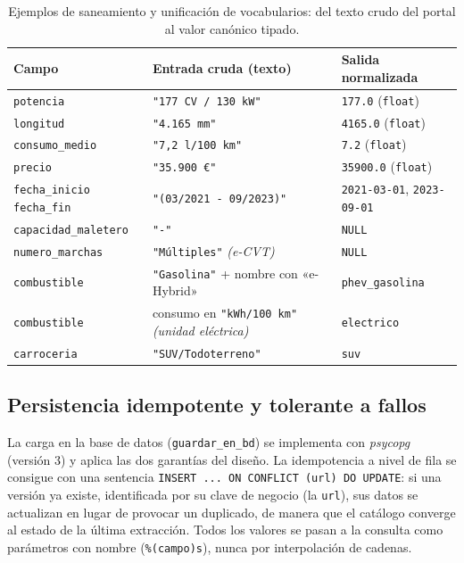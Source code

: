 \begin{table}[H]
\centering
\begin{tabular}{p{3.1cm}p{5.0cm}p{3.8cm}}
\hline
\textbf{Campo} & \textbf{Entrada cruda (texto)} & \textbf{Salida normalizada} \\
\hline
\texttt{potencia} & \texttt{"177 CV / 130 kW"} & \texttt{177.0} (\texttt{float}) \\
\hline
\texttt{longitud} & \texttt{"4.165 mm"} & \texttt{4165.0} (\texttt{float}) \\
\hline
\texttt{consumo\_medio} & \texttt{"7,2 l/100 km"} & \texttt{7.2} (\texttt{float}) \\
\hline
\texttt{precio} & \texttt{"35.900 \euro{}"} & \texttt{35900.0} (\texttt{float}) \\
\hline
\texttt{fecha\_inicio} \texttt{fecha\_fin} & \texttt{"(03/2021 - 09/2023)"} & \texttt{2021-03-01}, \texttt{2023-09-01} \\
\hline
\texttt{capacidad\_\allowbreak maletero} & \texttt{"-"} & \texttt{NULL} \\
\hline
\texttt{numero\_marchas} & \texttt{"Múltiples"} \emph{(e-CVT)} & \texttt{NULL} \\
\hline
\texttt{combustible} & \texttt{"Gasolina"} + nombre con «e-Hybrid» & \texttt{phev\_gasolina} \\
\hline
\texttt{combustible} & consumo en \texttt{"kWh/100 km"} \emph{(unidad eléctrica)} & \texttt{electrico} \\
\hline
\texttt{carroceria} & \texttt{"SUV/Todoterreno"} & \texttt{suv} \\
\hline
\end{tabular}
\caption{Ejemplos de saneamiento y unificación de vocabularios: del texto crudo
del portal al valor canónico tipado.}
\label{tab:crudo-normalizado}
\end{table}

\subsection{Persistencia idempotente y tolerante a fallos}
\label{sec:impl-etl-persistencia}

La carga en la base de datos (\texttt{guardar\_en\_bd}) se implementa con
\emph{psycopg} (versión 3) y aplica las dos garantías del diseño. La idempotencia
a nivel de fila se consigue con una sentencia \texttt{INSERT ... ON CONFLICT (url)
DO UPDATE}: si una versión ya existe, identificada por su clave de negocio (la
\texttt{url}), sus datos se actualizan en lugar de provocar un duplicado, de
manera que el catálogo converge al estado de la última extracción. Todos los
valores se pasan a la consulta como parámetros con nombre (\texttt{\%(campo)s}),
nunca por interpolación de cadenas.

